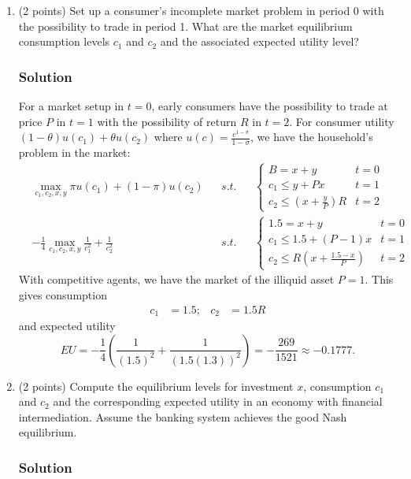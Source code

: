 \documentclass[12pt]{article}
\begin{document}
\begin{enumerate}[label=(\alph*)]
    \item (2 points) Set up a consumer’s incomplete market problem in period 0 with the possibility to trade in period 1. What are the market equilibrium consumption levels $c_1$ and $c_2$ and the associated expected utility level?
\subsubsection*{Solution}

    For a market setup in $t=0$, early consumers have the possibility to trade at price $P$ in $t=1$ with the possibility of return $R$ in $t=2$.
    For consumer utility $(1-\theta)u(c_1)+\theta u(c_2)$ where $u(c) = \frac{c^{1-\sigma}}{1-\sigma}$, we have the household's problem in the market: 
    \begin{align*}
        &\max_{c_1, c_2, x,y} \pi u(c_1) + (1-\pi)u(c_2) && s.t. && \begin{cases}
            B  =x+y & t=0
            \\ c_1 \leq y + Px & t=1
            \\ c_2 \leq \left(x + \frac{y}{P}\right)R & t=2
        \end{cases}
        \\ &-\frac{1}{4}\max_{c_1, c_2, x,y} \frac{1}{c_{1}^{2}}+\frac{1}{c_{2}^{2}}  && s.t. && \begin{cases}
             1.5 =x+y & t=0
            \\ c_1 \leq 1.5 + (P-1)x & t=1
            \\ c_2 \leq R\left(x + \frac{1.5-x}{P}\right) & t=2
        \end{cases}
    \end{align*}
    With competitive agents, we have the market of the illiquid asset $P=1.$ This gives consumption
    \begin{align*}
         c_1 &= 1.5;  &c_2 &= 1.5R
    \end{align*}
    and expected utility 
    \[ EU = -\frac{1}{4}\left( \frac{1}{(1.5)^{2}}+\frac{1}{(1.5(1.3))^{2}} \right) = -\frac{269}{1521} \approx -0.1777. \]


    \item (2 points) Compute the equilibrium levels for investment $x$, consumption $c_1$ and $c_2$ and the corresponding expected utility in an economy with financial intermediation. Assume the banking system achieves the good Nash equilibrium.
\subsubsection*{Solution}


\end{enumerate}
\end{document}
